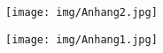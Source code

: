 \begin{figure}[H]
    \texttt{[image: img/Anhang2.jpg]}
\end{figure}
\begin{figure}[H]
    \texttt{[image: img/Anhang1.jpg]}
\end{figure}